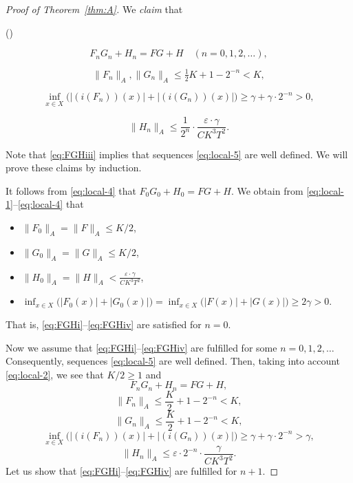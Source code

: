 \documentclass[12pt,fleqn]{amsart}
\theoremstyle{definition}
\numberwithin{equation}{section}
\theoremstyle{remark}
\newcounter{smallromans}
\newenvironment{romanenumerate}
{\begin{list}{{\normalfont\textrm{(\roman{smallromans})}}}%
  {\usecounter{smallromans}\setlength{\itemindent}{0cm}%
   \setlength{\leftmargin}{5.5ex}\setlength{\labelwidth}{5.5ex}%
   \setlength{\topsep}{.5ex}\setlength{\partopsep}{.5ex}%
   \setlength{\itemsep}{0.1ex}}}%
{\end{list}}
\newcommand{\e}{\varepsilon}
\begin{document}
\begin{proof}[Proof of Theorem~\ref{thm:A}]
We \emph{claim} that
%
\begin{romanenumerate}
    \item \label{eq:FGHi}
    \[
        F_nG_n+H_n=FG+H\quad (n = 0, 1, 2, \ldots),
    \]
    \item \label{eq:FGHii}
    \[
        \|F_n\|_{A}, \|G_n\|_{A}\leqslant \tfrac{1}{2}K+1-2^{-n}<K,
    \]
    \item \label{eq:FGHiii}
    \[
        \inf_{x\in X}\big(|(i(F_n))(x)|+|(i(G_n))(x)|\big)\geqslant \gamma +\gamma\cdot 2^{-n}>0,
    \]
    \item \label{eq:FGHiv}
    \[
        \|H_n\|_{A}\leqslant \frac{1}{2^n}\cdot\frac{\e \cdot \gamma}{C K^3 T^2}.
    \]
\end{romanenumerate}
%
Note that \eqref{eq:FGHiii} implies that sequences \eqref{eq:local-5} are well defined. We will prove these claims by induction. 

It follows from 
\eqref{eq:local-4} that $F_0G_0+H_0=FG+H.$ We obtain from \eqref{eq:local-1}--\eqref{eq:local-4} that
\begin{itemize}
    \item $ \|F_0\|_{A}=\|F\|_{A}\leqslant K/2$,
    \item $\|G_0\|_{A}=\|G\|_{A}\leqslant K/2$, 
    \item $\|H_0\|_{A}=\|H\|_{A}<\frac{\e \cdot \gamma}{CK^3T^2}$,
    \item $\inf_{x\in X}\big(|F_0(x)|+|G_0(x)|\big) =
            \inf_{x\in X}\big(|F(x)|+|G(x)|\big)\geqslant 2\gamma >0.$
\end{itemize}
That is, \eqref{eq:FGHi}--\eqref{eq:FGHiv} are satisfied for $n=0$.

Now we assume that \eqref{eq:FGHi}--\eqref{eq:FGHiv} are fulfilled for some $n = 0, 1,2, \ldots $ Consequently, sequences \eqref{eq:local-5} are well defined. 
Then, taking into account \eqref{eq:local-2}, we see that $K/2\geqslant 1$ and
%
\begin{equation}\label{eq:local-8}
F_nG_n+H_n=FG+H,
\end{equation}
\begin{equation}\label{eq:local-9}
\|F_n\|_{A}\leqslant \frac{K}{2}+1-2^{-n}<K,
\end{equation}
\begin{equation}\label{eq:local-10}
\|G_n\|_{A}\leqslant \frac{K}{2}+1-2^{-n}<K,
\end{equation}
\begin{equation}\label{eq:local-11}
\inf_{x\in X}\big(|(i(F_n))(x)|+|(i(G_n))(x)|\big)\geqslant \gamma+\gamma\cdot 2^{-n}>\gamma,
\end{equation}
\begin{equation}\label{eq:local-12}
\|H_n\|_{A}\leqslant \e\cdot 2^{-n}\cdot\frac{\gamma}{CK^3T^2}.
\end{equation}
%
Let us show that \eqref{eq:FGHi}--\eqref{eq:FGHiv} are fulfilled for $n+1$.


\end{proof}
\end{document}
